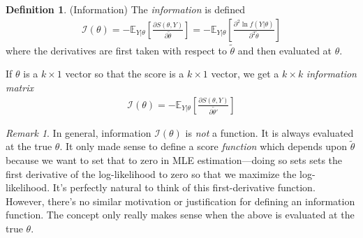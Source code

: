 \documentclass[12pt]{article}
\theoremstyle{plain}
\theoremstyle{definition}
\newtheorem{defn}[thm]{Definition}
\theoremstyle{remark}
\newtheorem*{rmk}{Remark}
\newcommand{\calI}{\mathcal{I}}
\newcommand{\E}{\mathbb{E}}
\begin{document}
\begin{defn}(Information)
The \emph{information} is defined
\begin{align*}
  \calI(\theta)
  =
  -\E_{Y|\theta}\left[
    \frac{\partial S(\theta,Y)}{\partial \tilde{\theta}}
  \right]
  =
  -\E_{Y|\theta}\left[
    \frac{\partial^2 \ln f(Y|\theta)}{\partial^2 \tilde{\theta}}
  \right]
\end{align*}
where the derivatives are first taken with respect to $\tilde{\theta}$
and then evaluated at $\theta$.

If $\theta$ is a $k\times 1$ vector so that the score is a $k\times 1$
vector, we get a $k\times k$ \emph{information matrix}
\begin{align*}
  \calI(\theta)
  =
  -\E_{Y|\theta}\left[
    \frac{\partial S(\theta,Y)}{\partial \tilde{\theta}'}
  \right]
\end{align*}
\end{defn}
\begin{rmk}
In general, information $\calI(\theta)$ is \emph{not} a function. It is
always evaluated at the true $\theta$. It only made sense to define a
score \emph{function} which depends upon $\tilde{\theta}$ because we
want to set that to zero in MLE estimation---doing so sets sets the
first derivative of the log-likelihood to zero so that we maximize the
log-likelihood. It's perfectly natural to think of this first-derivative
function. However, there's no similar motivation or justification
for defining an information function.  The concept only really makes
sense when the above is evaluated at the true $\theta$.
\end{rmk}
\end{document}
